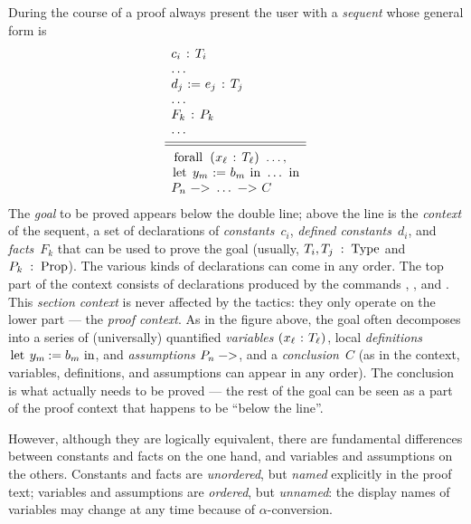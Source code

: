 During the course of a proof \Coq{} always present the user with
a \emph{sequent} whose general form is
\begin{displaymath}\begin{array}{l}
c_i\ \ssrC{:}\ T_i \\
\dots\\
d_j\ \ssrC{:=}\ e_j\ \ssrC{:}\ T_j \\
\dots\\
F_k\ \ssrC{:}\ P_k \\
\dots \\[3pt]
\hline\hline\\[-8pt]
\ssrC{forall}\ \ssrC{(}x_\ell\ \ssrC{:}\ T_\ell\ssrC{)}\ \dots,\\
\ssrC{let}\ y_m\ \ssrC{:=}\ b_m\ \ssrC{in}\ \dots\ \ssrC{in}\\
P_n\ \ssrC{->}\ \dots\ \ssrC{->}\ C
\end{array}\end{displaymath}
The \emph{goal} to be proved appears below the double line; above the line is
the \emph{context} of the sequent, a set of declarations of
\emph{constants}~$c_i$, \emph{defined constants}~$d_i$, and
\emph{facts}~$F_k$ that can be used to prove the goal (usually, $T_i,
T_j\;:\;\ssrC{Type}$ and $P_k\;:\;\ssrC{Prop}$). The various kinds of
declarations can come in any order. The top part of the context
consists of declarations produced by the  commands
, , and . This \emph{section context}
is never affected by the \ssr{} tactics: they only operate on
the lower part --- the \emph{proof context}.
As in the figure above, the goal often decomposes into a series of
(universally) quantified \emph{variables}
$\ssrC{(}x_\ell\;\ssrC{:}\;T_\ell\ssrC{)}$, local \emph{definitions}
$\ssrC{let}\;y_m\:\ssrC{:=}\;b_m\;\ssrC{in}$, and \emph{assumptions}
$P_n\;\ssrC{->}$, and a \emph{conclusion}~$C$ (as in the context, variables,
definitions, and assumptions can appear in any order). The conclusion
is what actually needs to be proved --- the rest of the goal can be
seen as a part of the proof context that happens to be ``below the line''.

However, although they are logically equivalent, there are fundamental
differences between constants and facts on the one hand, and variables
and assumptions on the others. Constants and facts are
\emph{unordered}, but \emph{named} explicitly in the proof text;
variables and assumptions are \emph{ordered}, but \emph{unnamed}: the
display names of variables may change at any time because of
$\alpha$-conversion.

